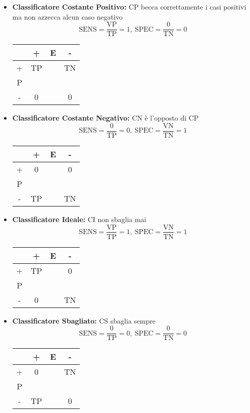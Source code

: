 \documentclass[11pt]{report}
\begin{document}
\begin{itemize}
	\item \textbf{Classificatore Costante Positivo:} $\text{CP}$ becca correttamente i casi positivi ma non azzecca alcun caso negativo
	$$\text{SENS} = \frac{\text{VP}}{\text{TP}} = 1,\ \text{SPEC} = \frac{0}{\text{TN}} = 0$$
	\begin{center}
	\begin{tabular}{ c| c c c }
		& + & E & - \\
		\hline
		+ & TP & & TN \\ 
		P \\
		- & 0 & & 0
	\end{tabular}
	\end{center}
	\item \textbf{Classificatore Costante Negativo:} $\text{CN}$ è l'opposto di $\text{CP}$
	$$\text{SENS} = \frac{0}{\text{TP}} = 0,\ \text{SPEC} = \frac{\text{VN}}{\text{TN}} = 1$$
	\begin{center}
	\begin{tabular}{ c| c c c }
		& + & E & - \\
		\hline
		+ & 0 & & 0 \\ 
		P \\
		- & TP & & TN
	\end{tabular}
	\end{center}
	\item \textbf{Classificatore Ideale:} $\text{CI}$ non sbaglia mai
	$$\text{SENS} = \frac{\text{VP}}{\text{TP}} = 1,\ \text{SPEC} = \frac{\text{VN}}{\text{TN}} = 1$$
	\begin{center}
	\begin{tabular}{ c| c c c }
		& + & E & - \\
		\hline
		+ & TP & & 0 \\ 
		P \\
		- & 0 & & TN
	\end{tabular}
	\end{center}
	\item \textbf{Classificatore Sbagliato:} $\text{CS}$ sbaglia sempre
	$$\text{SENS} = \frac{0}{\text{TP}} = 0,\ \text{SPEC} = \frac{0}{\text{TN}} = 0$$
	\begin{center}
	\begin{tabular}{ c| c c c }
		& + & E & - \\
		\hline
		+ & 0 & & TN \\ 
		P \\
		- & TP & & 0
	\end{tabular}
	\end{center}

\end{itemize}
\end{document}
